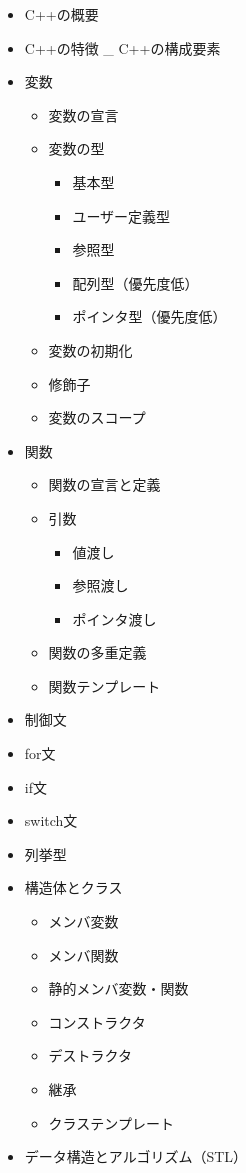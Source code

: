 \documentclass[]{book}
\providecommand{\tightlist}{%
  \setlength{\itemsep}{0pt}\setlength{\parskip}{0pt}}
\begin{document}
\begin{itemize}
\item
  C++の概要
\item
  C++の特徴 \_ C++の構成要素
\item
  変数

  \begin{itemize}
  \tightlist
  \item
    変数の宣言
  \item
    変数の型

    \begin{itemize}
    \tightlist
    \item
      基本型
    \item
      ユーザー定義型
    \item
      参照型
    \item
      配列型（優先度低）
    \item
      ポインタ型（優先度低）
    \end{itemize}
  \item
    変数の初期化
  \item
    修飾子
  \item
    変数のスコープ
  \end{itemize}
\item
  関数

  \begin{itemize}
  \tightlist
  \item
    関数の宣言と定義
  \item
    引数

    \begin{itemize}
    \tightlist
    \item
      値渡し
    \item
      参照渡し
    \item
      ポインタ渡し
    \end{itemize}
  \item
    関数の多重定義
  \item
    関数テンプレート
  \end{itemize}
\item
  制御文
\item
  for文
\item
  if文
\item
  switch文
\item
  列挙型
\item
  構造体とクラス

  \begin{itemize}
  \tightlist
  \item
    メンバ変数
  \item
    メンバ関数
  \item
    静的メンバ変数・関数
  \item
    コンストラクタ
  \item
    デストラクタ
  \item
    継承
  \item
    クラステンプレート
  \end{itemize}
\item
  データ構造とアルゴリズム（STL）


\end{itemize}
\end{document}
